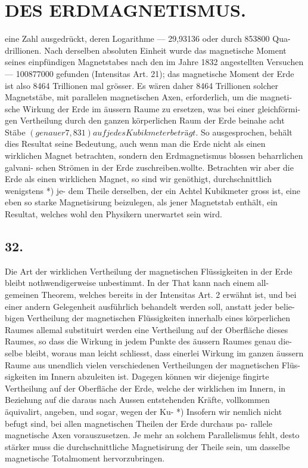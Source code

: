\documentclass[12pt,a4paper]{article}
\begin{document}
\newpage


\section*{DES ERDMAGNETISMUS.}
eine Zahl ausgedrückt, deren Logarithme --- 29,93136 oder durch 853800 Qua- drillionen. Nach derselben absoluten Einheit wurde das magnetische Moment seines einpfündigen Magnetstabes nach den im Jahre 1832 angestellten Versuchen --- 100877000 gefunden (Intensitas Art. 21); das magnetische Moment der Erde ist also 8464 Trillionen mal grösser. Es wären daher 8464 Trillionen solcher Magnetstäbe, mit parallelen magnetischen Axen, erforderlich, um die magneti- sche Wirkung der Erde im äussern Raume zu ersetzen, was bei einer gleichförmi- gen Vertheilung durch den ganzen körperlichen Raum der Erde beinahe acht Stäbe
$(genauer 7,831) auf jedes Kubikmeter beträgt.$
So ausgesprochen, behält dies Resultat seine Bedeutung, auch wenn man die Erde nicht als einen wirklichen Magnet betrachten, sondern den Erdmagnetismus blossen beharrlichen galvani- schen Strömen in der Erde zuschreiben.wollte. Betrachten wir aber die Erde als einen wirklichen Magnet, so sind wir genöthigt, durchschnittlich wenigstens *) je- dem Theile derselben, der ein Achtel Kubikmeter gross ist, eine eben so starke Magnetisirung beizulegen, als jener Magnetstab enthält, ein Resultat, welches wohl den Physikern unerwartet sein wird.

\subsection*{32.}
Die Art der wirklichen Vertheilung der magnetischen Flüssigkeiten in der Erde bleibt nothwendigerweise unbestimmt. In der That kann nach einem all- gemeinen Theorem, welches bereits in der Intensitas Art. 2 erwähnt ist, und bei einer andern Gelegenheit ausführlich behandelt werden soll, anstatt jeder belie- bigen Vertheilung der magnetischen Flüssigkeiten innerhalb eines körperlichen Raumes allemal substituirt werden eine Vertheilung auf der Oberfläche dieses Raumes, so dass die Wirkung in jedem Punkte des äussern Raumes genau die- selbe bleibt, woraus man leicht schliesst, dass einerlei Wirkung im ganzen äussern Raume aus unendlich vielen verschiedenen Vertheilungen der magnetischen Flüs- sigkeiten im Innern abzuleiten ist. Dagegen können wir diejenige fingirte Vertheilung auf der Oberfläche der Erde, welche der wirklichen im Innern, in Beziehung auf die daraus nach Aussen entstehenden Kräfte, vollkommen äquivalirt, angeben, und sogar, wegen der Ku- *) Insofern wir nemlich nicht befugt sind, bei allen magnetischen Theilen der Erde durchaus pa- rallele magnetische Axen vorauszusetzen. Je mehr an solchem Parallelismus fehlt, desto stärker muss die durchschnittliche Magnetisirung der Theile sein, um dasselbe magnetische Totalmoment hervorzubringen.
\end{document}
